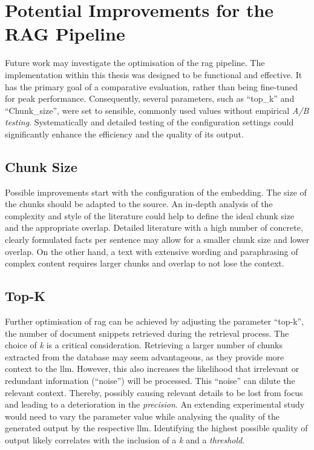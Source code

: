 \section[Improvements - RAG Pipeline]{Potential Improvements for the RAG Pipeline}

Future work may investigate the optimisation of the \ac{rag} pipeline.
The implementation within this thesis was designed to be functional and effective.
It has the primary goal of a comparative evaluation, rather than being fine-tuned for peak performance. 
Consequently, several parameters, such as \enquote{top\_k} and \enquote{Chunk\_size}, were set to sensible, commonly used values without empirical \textit{A/B testing}.
Systematically and detailed testing of the configuration settings could significantly enhance the efficiency and the quality of its output.
%
\subsection{Chunk Size}
Possible improvements start with the configuration of the embedding.
The size of the chunks should be adapted to the source.
An in-depth analysis of the complexity and style of the literature could help to define the ideal chunk size and the appropriate overlap.
Detailed literature with a high number of concrete, clearly formulated facts per sentence may allow for a smaller chunk size and lower overlap.
On the other hand, a text with extensive wording and paraphrasing of complex content requires larger chunks and overlap to not lose the context.
%
\subsection{Top-K}
Further optimisation of \ac{rag} can be achieved by adjusting the parameter \enquote{top-k}, the number of document snippets retrieved during the retrieval process.
The choice of \textit{k} is a critical consideration.
Retrieving a larger number of chunks extracted from the database may seem advantageous, as they provide more context to the \ac{llm}.
However, this also increases the likelihood that irrelevant or redundant information (\enquote{noise}) will be processed.
This \enquote{noise} can dilute the relevant context.
Thereby, possibly causing relevant details to be lost from focus and leading to a deterioration in the \textit{precision}.
An extending experimental study would need to vary the parameter value while analysing the quality of the generated output by the respective \ac{llm}.
Identifying the highest possible quality of output likely correlates with the inclusion of a \textit{k} and a \textit{threshold}.
%
